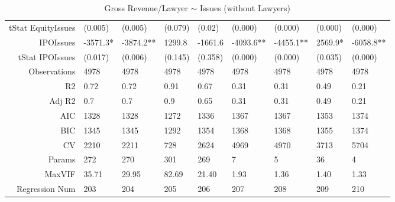 \begin{table}[ht]
\begin{tabular}{rllllllll}
  tStat EquityIssues & (0.005) & (0.005) & (0.079) & (0.02) & (0.000) & (0.000) & (0.000) & (0.000) \\ 
  IPOIssues & -3571.3* & -3874.2** & 1299.8 & -1661.6 & -4093.6** & -4455.1** & 2569.9* & -6058.8** \\ 
  tStat IPOIssues & (0.017) & (0.006) & (0.145) & (0.358) & (0.000) & (0.000) & (0.035) & (0.000) \\ 
  Observations & 4978 & 4978 & 4978 & 4978 & 4978 & 4978 & 4978 & 4978 \\ 
  R2 & 0.72 & 0.72 & 0.91 & 0.67 & 0.31 & 0.31 & 0.49 & 0.21 \\ 
  Adj R2 & 0.7 & 0.7 & 0.9 & 0.65 & 0.31 & 0.31 & 0.49 & 0.21 \\ 
  AIC & 1328 & 1328 & 1272 & 1336 & 1367 & 1367 & 1353 & 1374 \\ 
  BIC & 1345 & 1345 & 1292 & 1354 & 1368 & 1368 & 1355 & 1374 \\ 
  CV & 2210 & 2211 & 728 & 2624 & 4969 & 4970 & 3713 & 5704 \\ 
  Params & 272 & 270 & 301 & 269 & 7 & 5 & 36 & 4 \\ 
  MaxVIF & 35.71 & 29.95 & 82.69 & 21.40 & 1.93 & 1.36 & 1.40 & 1.33 \\ 
  Regression Num & 203 & 204 & 205 & 206 & 207 & 208 & 209 & 210 \\ 
   \hline
\end{tabular}
\caption{Gross Revenue/Lawyer $\sim$ Issues (without Lawyers)} 
\end{table}
